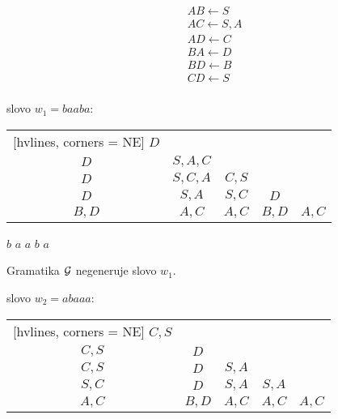 \begin{multicols}{2}
    \begin{align*}
        & AB \leftarrow S \\
        & AC \leftarrow S, A \\
        & AD \leftarrow C \\
        & BA \leftarrow D \\
        & BD \leftarrow B \\ 
        & CD \leftarrow S \\ 
    \end{align*}
    
    slovo $w_1 = baaba$: 

    \vspace*{2mm}

    \begin{NiceTabular}{ccccc}[hvlines, corners = NE] %
        $D$ &  &   &   &   \\ 
        $D$ & $S, A, C$ &  &   &   \\ 
        $D$ & $S, C, A$ & $C, S$ &  &  \\ 
        $D$ & $S, A$ & $S, C$ & $D$ &  \\ 
        $B, D$ & $A,C$ & $A,C$ & $B, D$ & $A, C$ \\ 
    \end{NiceTabular}

    \hspace*{5mm}$b$ \hspace*{10mm} $a$ \hspace*{10mm} $a$ \hspace*{9mm} $b$ \hspace*{8mm} $a$
        
    \vspace*{2mm}
    Gramatika $\mathcal{G}$ negeneruje slovo $w_1$. 

    slovo $w_2 = abaaa$: 
        
    \begin{NiceTabular}{ccccc}[hvlines, corners = NE] %
        $C,S$ &   &   &   &   \\ 
        $C, S$ & $D$ &   &   &   \\ 
        $C,S$ & $D$ & $S,A$ &   &   \\ 
        $S,C$ & $D$ & $S,A$ & $S,A$ &   \\ 
        $A,C$ & $B, D$ & $A,C$ & $A,C$ & $A,C$ \\ 
    \end{NiceTabular}
        

\end{multicols}
